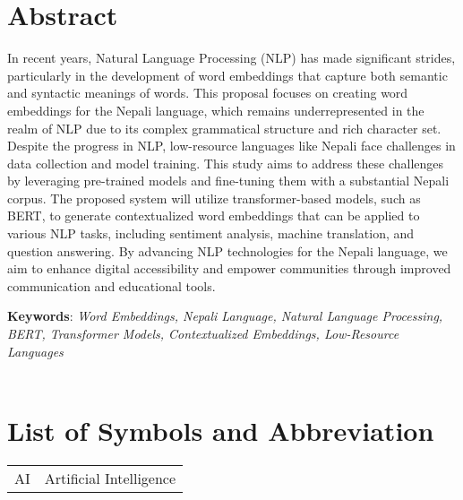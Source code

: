 		
		
		\large
			\chapter*{Abstract}
		\normalsize
        \noindent
		In recent years, Natural Language Processing (NLP) has made significant strides, particularly in the development of word embeddings that capture both semantic and syntactic meanings of words. This proposal focuses on creating word embeddings for the Nepali language, which remains underrepresented in the realm of NLP due to its complex grammatical structure and rich character set. Despite the progress in NLP, low-resource languages like Nepali face challenges in data collection and model training. This study aims to address these challenges by leveraging pre-trained models and fine-tuning them with a substantial Nepali corpus. The proposed system will utilize transformer-based models, such as BERT, to generate contextualized word embeddings that can be applied to various NLP tasks, including sentiment analysis, machine translation, and question answering. By advancing NLP technologies for the Nepali language, we aim to enhance digital accessibility and empower communities through improved communication and educational tools.

		\noindent
		\textbf{Keywords}: 
		\textit{Word Embeddings, Nepali Language, Natural Language Processing, BERT, Transformer Models, Contextualized Embeddings, Low-Resource Languages\\
 }\\

		\break


	    \tableofcontents

		\listoftables
		\break
		\pagebreak

		\listoffigures
		\break
	
	
	
		\Large
			\begingroup
				\let\clearpage\relax
				\chapter*{List of Symbols and Abbreviation}
			\endgroup
   
		\normalsize
		\begin{tabular}{p{1in}p{5in}} 
                AI & Artificial Intelligence\\
                
            \end{tabular}





		\break
		\pagebreak
		
	